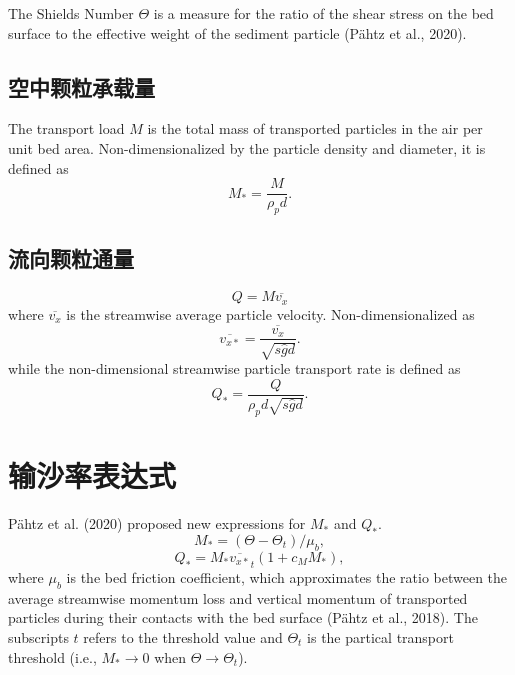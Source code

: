 \documentclass[12pt,a4paper]{article}
\begin{document}
The Shields Number $\Theta$ is a measure for the ratio of the shear stress on the bed surface to the effective weight of the sediment particle (P\"ahtz et al., 2020).

\subsection{空中颗粒承载量}

The transport load $M$ is the total mass of transported particles in the air per unit bed area. Non-dimensionalized by the particle density and diameter, it is defined as
\begin{equation}
    M_* = \frac{M}{\rho_p d}.
\end{equation}

\subsection{流向颗粒通量}
\begin{equation}
    Q = M \overline{v_x}
\end{equation}
where $\overline{v_x}$ is the streamwise average particle velocity. Non-dimensionalized as
\begin{equation}
    \overline{v_{x*}} = \frac{\overline{v_x}}{\sqrt{s \hat{g} d}}.
\end{equation}
while the non-dimensional streamwise particle transport rate is defined as
\begin{equation}
    Q_* = \frac{Q}{\rho_p d \sqrt{s \hat{g} d}}.
\end{equation}

\section{输沙率表达式}
P\"ahtz et al. (2020) proposed new expressions for $M_*$ and $Q_*$.
\begin{equation}
    M_* = (\Theta - \Theta_t)/\mu_b,
\end{equation}
\begin{equation}
    Q_* = M_* \overline{v_{x*}}_t (1 + c_M M_*) \label{eq:Qstar},
\end{equation}
where $\mu_b$ is the bed friction coefficient, which approximates the ratio between the average streamwise momentum loss and vertical momentum of transported particles during their contacts with the bed surface (P\"ahtz et al., 2018). The subscripts $t$ refers to the threshold value and $\Theta_t$ is the partical transport threshold (i.e., $M_* \rightarrow 0$ when $\Theta \rightarrow \Theta_t$).
\end{document}

